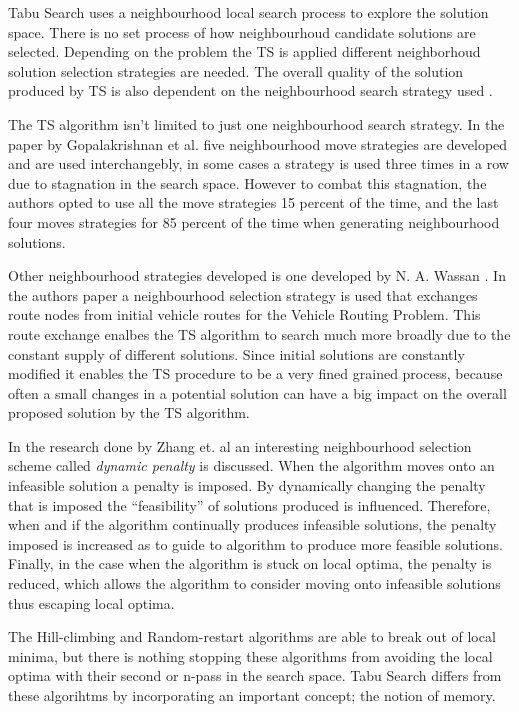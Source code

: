 Tabu Search uses a neighbourhood local search process to explore the solution space. There is no set process of how neighbourhoud candidate solutions are selected. Depending on the problem the TS is applied different neighborhoud solution selection strategies are needed. The overall quality of the solution produced by TS is also dependent on the neighbourhood search strategy used \cite{TSHazardous}. 

The TS algorithm isn't limited to just one neighbourhood search strategy. In the paper by Gopalakrishnan et al.\cite{TabuCarryOver} five neighbourhood move strategies are developed and are used interchangebly, in some cases a strategy is used three times in a row due to stagnation in the search space. However to combat this stagnation, the authors opted to use all the move strategies 15 percent of the time, and the last four moves strategies for 85 percent of the time when generating neighbourhood solutions.

Other neighbourhood strategies developed is one developed by N. A. Wassan \cite{ReactiveTabuVHR}. In the authors paper a neighbourhood selection strategy is used that exchanges route nodes from initial vehicle routes for the Vehicle Routing Problem. This route exchange enalbes the TS algorithm to search much more broadly due to the constant supply of different solutions. Since initial solutions are constantly modified it enables the TS procedure to be a very fined grained process, because often a small changes in a potential solution can have a big impact on the overall proposed solution by the TS algorithm.

In the research done by Zhang et. al \cite{TSHazardous} an interesting neighbourhood selection scheme called \emph{dynamic penalty} is discussed. When the algorithm moves onto an infeasible solution a penalty is imposed. By dynamically changing the penalty that is imposed the ``feasibility'' of solutions produced is influenced. Therefore, when and if the algorithm continually produces infeasible solutions, the penalty imposed is increased as to guide to algorithm to produce more feasible solutions. Finally, in the case when the algorithm is stuck on local optima, the penalty is reduced, which allows the algorithm to consider moving onto infeasible solutions thus escaping local optima.

The Hill-climbing and Random-restart algorithms are able to break out of local minima, but there is nothing stopping these algorithms from avoiding the local optima with their second or n-pass in the search space. Tabu Search differs from these algorihtms by incorporating an important concept; the notion of memory.

